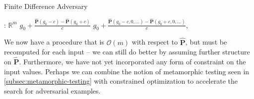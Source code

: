 \documentclass[12pt,initial,twoside,maitrise]{dms}
\numberwithin{equation}{section}
\numberwithin{table}{chapter}
\numberwithin{figure}{chapter}
\begin{document}
\begin{algorithm}[H]
\caption{Finite Difference Adversary}
\label{alg:fd_fuzz}
\begin{algorithmic}[1]
: $\mathbb{R}^m$
 
\State \Return $g_0 + \frac{\mathbf{\hat P}(g_0 - c) - \mathbf{\hat P}(g_0 + c)}{c}$
\Else {}
\State \Return $g_0 + \frac{\mathbf{\hat P}(g_0 - c, 0, \ldots) - \mathbf{\hat P}(g_0 + c, 0, \ldots)}{c}$, 
\EndIf
\EndProcedure
\end{algorithmic}
\end{algorithm}

We now have a procedure that is $\mathcal{O}(m)$ with respect to $\mathbf{\hat P}$, but must be recomputed for each input -- we can still do better by assuming further structure on $\mathbf{\hat P}$. Furthermore, we have not yet incorporated any form of constraint on the input values. Perhaps we can combine the notion of metamorphic testing seen in \autoref{subsec:metamorphic-testing} with constrained optimization to accelerate the search for adversarial examples.
\end{document}
